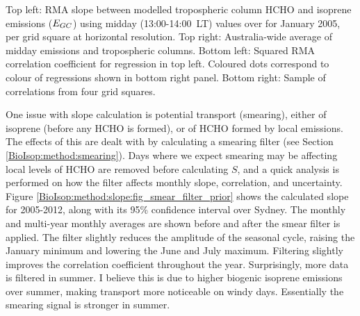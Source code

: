     
    { %
      Top left: RMA slope between modelled tropospheric column HCHO and isoprene emissions ($E_{GC}$) using midday (13:00-14:00~LT) values over for January 2005, per grid square at \lowhr horizontal resolution.
      Top right: Australia-wide average of midday emissions and tropospheric columns.
      Bottom left: Squared RMA correlation coefficient for regression in top left. Coloured dots correspond to colour of regressions shown in bottom right panel.
      Bottom right: Sample of correlations from four grid squares.
    }
    {\label{BioIsop:method:slope:fig_regressions}}
    
    
    One issue with slope calculation is potential transport (smearing), either of isoprene (before any HCHO is formed), or of HCHO formed by local emissions.
    The effects of this are dealt with by calculating a smearing filter (see Section \ref{BioIsop:method:smearing}).
    Days where we expect smearing may be affecting local levels of HCHO are removed before calculating $S$, and a quick analysis is performed on how the filter affects monthly slope, correlation, and uncertainty.
    Figure \ref{BioIsop:method:slope:fig_smear_filter_prior} shows the calculated slope for 2005-2012, along with its 95\% confidence interval over Sydney.
    The monthly and multi-year monthly averages are shown before and after the smear filter is applied.
    The filter slightly reduces the amplitude of the seasonal cycle, raising the January minimum and lowering the June and July maximum.
    Filtering slightly improves the correlation coefficient throughout the year.
    Surprisingly, more data is filtered in summer.
    I believe this is due to higher biogenic isoprene emissions over summer, making transport more noticeable on windy days.
    Essentially the smearing signal is stronger in summer.
